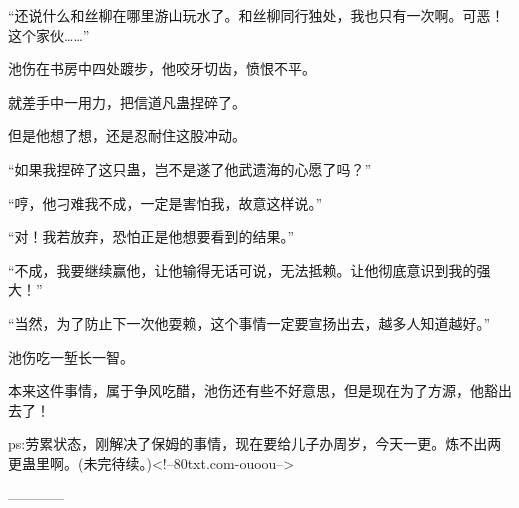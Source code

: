 \begin{this_body}
“还说什么和丝柳在哪里游山玩水了。和丝柳同行独处，我也只有一次啊。可恶！这个家伙……”

池伤在书房中四处踱步，他咬牙切齿，愤恨不平。

就差手中一用力，把信道凡蛊捏碎了。

但是他想了想，还是忍耐住这股冲动。

“如果我捏碎了这只蛊，岂不是遂了他武遗海的心愿了吗？”

“哼，他刁难我不成，一定是害怕我，故意这样说。”

“对！我若放弃，恐怕正是他想要看到的结果。”

“不成，我要继续赢他，让他输得无话可说，无法抵赖。让他彻底意识到我的强大！”

“当然，为了防止下一次他耍赖，这个事情一定要宣扬出去，越多人知道越好。”

池伤吃一堑长一智。

本来这件事情，属于争风吃醋，池伤还有些不好意思，但是现在为了方源，他豁出去了！

ps:劳累状态，刚解决了保姆的事情，现在要给儿子办周岁，今天一更。炼不出两更蛊里啊。(未完待续。)<!--80txt.com-ouoou-->

------------

\end{this_body}

